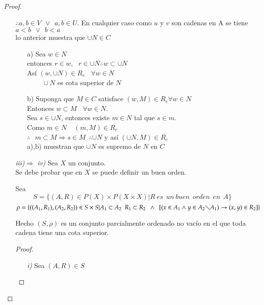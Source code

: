 \begin{proof}
\begin{itemize}
$ \therefore a, b \in V \ \  \vee  \ \ a,b \in U  $. En cualquier caso como $ u $ y $ v$ son cadenas en A se tiene $ a < b \ \ \vee \ \  b < a $ \\
lo anterior muestra que $ \cup N \in C $\\
\begin{itemize}
\item[a)] Sea $ w \in N $\\
entonces  $ r \in w, \ \ \ r \in \cup N  \therefore w \subset \cup N $ \\
Así $ (w,  \cup N) \in R_{c} \ \ \  \ \forall w  \in N $\\
$  \ \ \ \ \ \  \ \ \ \ \cup N  $ es cota superior de $ N $ \\
\item[b)] Suponga que $ M \in C $ satisface $ (w, M) \in R_{c}  \forall w \in N  $ \\
Entonces $ w \subset  M \ \ \ \  \forall w \in N  $.\\
Sea $ s \in \cup N  $, entonces existe $ m \in N $ tal que $ s \in m $.\\
Como $ m \in N  \  \ \ \ \  (m, M) \in R_{c} $\\
$ \therefore  \  \  \  m \subset M \Rightarrow  s \in M  \  \  \therefore \cup N  $ y así $ (\cup N, M) \in R_{c} $ \\
a),b) muestran que $ \cup N  $ es supremo de $ N $ en $ C $

\end{itemize}

\item[\textit{iii)}$ \Longrightarrow $  \textit{iv)}] Sea $ X $ un conjunto.\\
Se debe probar  que en $  X $ se puede definir un buen orden.

Sea $$ S = \lbrace (A,R) \in P(X) \times P(X \times X) | R \  es \ \  un \   buen \ \  orden \ \  en  \ \   A \rbrace $$
$$ \rho = \lbrace ((A_{1},R_{1}), (A_{2},R_{2})) \in S \times S | A_{1} \subset A_{2} \ \  R_{1} \subset R_{2} \ \ \wedge \ \ [ (x \in A_{1} \wedge y \in A_{2} \diagdown A_{1}) \rightarrow (x,y) \in R_{2} ]  \rbrace $$

Hecho $(S, \rho)$ es un conjunto parcialmente  ordenado no vacío en el que toda cadena tiene una cota superior.\\

\begin{proof}
\begin{itemize}
\item[\textit{i)}] Sea $ (A,R) \in S $
\end{itemize}
\end{proof}


\end{itemize}
 \end{proof}

